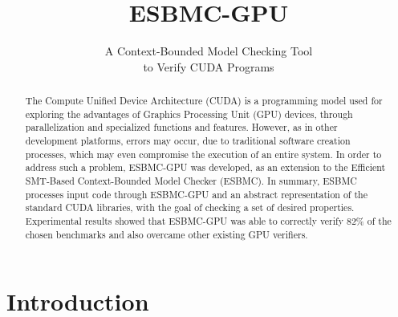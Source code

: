 \documentclass{llncs}
\begin{document}
\title{ESBMC-GPU}
\subtitle{A Context-Bounded Model Checking Tool \\ to Verify CUDA Programs}


%
%


\maketitle

\begin{abstract}
The Compute Unified Device Architecture (CUDA) is a programming model used for exploring the advantages of Graphics Processing Unit (GPU) devices, through parallelization and specialized functions and features. However, as in other development platforms, errors may occur, due to traditional software creation processes, which may even compromise the execution of an entire system. In order to address such a problem, ESBMC-GPU was developed, as an extension to the Efficient SMT-Based Context-Bounded Model Checker (ESBMC). In summary, ESBMC processes input code through ESBMC-GPU and an abstract representation of the standard CUDA libraries, with the goal of checking a set of desired properties. Experimental results showed that ESBMC-GPU was able to correctly verify $82$\% of the chosen benchmarks and also overcame other existing GPU verifiers.%
\end{abstract}


\section{Introduction} 
\label{sec:intro}
\end{document}
